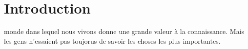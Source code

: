 
\chapter{Introduction}

 monde dans lequel nous vivons donne une grande valeur à la
 connaissance. Mais les gens n'essaient pas toujorus de savoir les choses les
 plus importantes.




